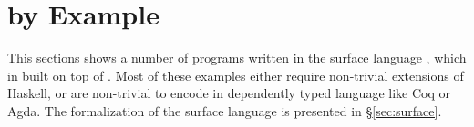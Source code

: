 \newcommand{\framedhslinecorrect}[2]%
  {#1[#2]}

\newcommand{\framedhs}{\sethscode{framedhscode}}


\newenvironment{inlinehscode}%
  {\(\def\column##1##2{}%
   \let\>\undefined\let\<\undefined\let\\\undefined
   \newcommand\>[1][]{}\newcommand\<[1][]{}\newcommand\\[1][]{}%
   \def\fromto##1##2##3{##3}%
   \def\nextline{}}{\) }%

\newcommand{\inlinehs}{\sethscode{inlinehscode}}


\newenvironment{joincode}%
  {\let\orighscode=\hscode
   \let\origendhscode=\endhscode
   \def\endhscode{\def\hscode{\endgroup\def\@currenvir{hscode}\\}\begingroup}
   \orighscode\def\hscode{\endgroup\def\@currenvir{hscode}}}%
  {\origendhscode
   \global\let\hscode=\orighscode
   \global\let\endhscode=\origendhscode}%

\makeatother
\EndFmtInput
%


\section{\sufcc by Example}
\label{sec:app}

 


This sections shows a number of programs written in the surface
language \sufcc, which in built on top of \name. Most of these
examples either require non-trivial extensions of Haskell, or are
non-trivial to encode in dependently typed language like Coq or
Agda. The formalization of the surface language is presented in
\S\ref{sec:surface}.

